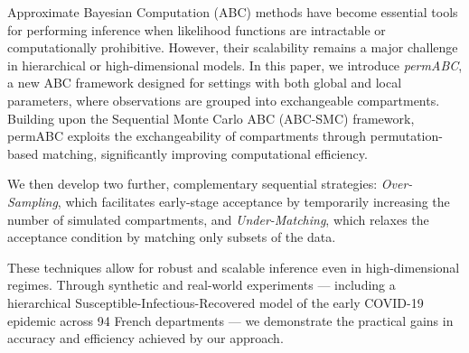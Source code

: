 Approximate Bayesian Computation (ABC) methods have become essential tools for performing inference when likelihood functions are intractable or computationally prohibitive. However, their scalability remains a major challenge in hierarchical or high-dimensional models. In this paper, we introduce \emph{permABC}, a new ABC framework designed for settings with both global and local parameters, where observations are grouped into exchangeable compartments.
Building upon the Sequential Monte Carlo ABC (ABC-SMC) framework, permABC exploits the exchangeability of compartments through permutation-based matching, significantly improving computational efficiency. 

We then develop two further, complementary sequential strategies: \emph{Over-Sampling}, which  facilitates early-stage acceptance by temporarily increasing the number of simulated compartments, and \emph{Under-Matching}, which relaxes the acceptance condition by matching only subsets of the data.

These techniques allow for robust and scalable inference even in high-dimensional regimes.  Through synthetic and real-world experiments — including a hierarchical Susceptible-Infectious-Recovered model of the early COVID-19 epidemic across 94 French departments — we demonstrate the practical gains in accuracy and efficiency achieved by our approach.
\